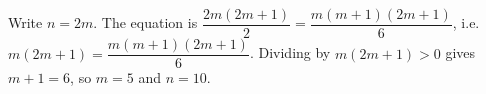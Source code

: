 Write $n=2m$. The equation is $\dfrac{2m(2m+1)}2=\dfrac{m(m+1)(2m+1)}6$, i.e. $m(2m+1)=\dfrac{m(m+1)(2m+1)}6$. Dividing by $m(2m+1)>0$ gives $m+1=6$, so $m=5$ and $n=\boxed{10}$.
